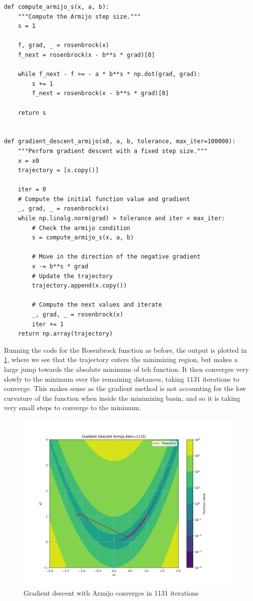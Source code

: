 \documentclass[11pt]{article}
\theoremstyle{problemstyle}
\begin{document}
\begin{verbatim}
def compute_armijo_s(x, a, b):
    """Compute the Armijo step size."""
    s = 1

    f, grad, _ = rosenbrock(x)
    f_next = rosenbrock(x - b**s * grad)[0]

    while f_next - f >= - a * b**s * np.dot(grad, grad):
        s += 1
        f_next = rosenbrock(x - b**s * grad)[0]

    return s


def gradient_descent_armijo(x0, a, b, tolerance, max_iter=100000):
    """Perform gradient descent with a fixed step size."""
    x = x0
    trajectory = [x.copy()]

    iter = 0
    # Compute the initial function value and gradient
    _, grad, _ = rosenbrock(x)
    while np.linalg.norm(grad) > tolerance and iter < max_iter:
        # Check the armijo condition
        s = compute_armijo_s(x, a, b)

        # Move in the direction of the negative gradient
        x -= b**s * grad
        # Update the trajectory
        trajectory.append(x.copy())

        # Compute the next values and iterate
        _, grad, _ = rosenbrock(x)
        iter += 1
    return np.array(trajectory)
\end{verbatim}

Running the code for the Rosenbrock function as before, the output is plotted in
\ref{fig:grad_armijo}, where we see that the trajectory enters the minimizing
region, but makes a large jump towards the absolute minimum of teh function. It
then converges very slowly to the minimum over the remaining distances, taking
$1131$ iterations to converge. This makes sense as the gradient method is not
accounting for the low curvature of the function when inside the minimizing
basin, and so it is taking very small steps to converge to the minimum.

\begin{figure}[H]
  \centering
  \includegraphics[width=.9\textwidth]{grad_armijo.png}
  \caption{Gradient descent with Armijo converges in 1131 iterations}
  \label{fig:grad_armijo}
\end{figure}
\end{document}

